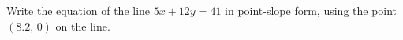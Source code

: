 Write the equation of the line $5x+12y=41$ in point-slope form, using the point $(8.2,\,0)$ on the line.
